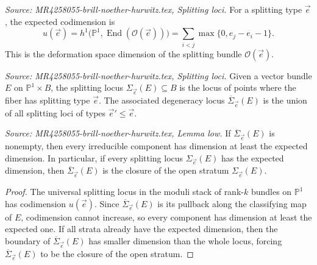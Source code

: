 \begin{definition}
  \label{def:expected-codim}
  \textit{Source: MR4258055-brill-noether-hurwitz.tex, Splitting loci.}
  For a splitting type \(\vec e\), the expected codimension is
  \[
  u(\vec e)=h^1\!\bigl(\mathbb P^1,\operatorname{End}(\mathcal O(\vec e))\bigr)
  =\sum_{i<j}\max\{0,e_j-e_i-1\}.
  \]
  This is the deformation space dimension of the splitting bundle \(\mathcal O(\vec e)\).
\end{definition}

\begin{definition}
  \label{def:splitting-locus}
  \textit{Source: MR4258055-brill-noether-hurwitz.tex, Splitting loci.}
  Given a vector bundle \(E\) on \(\mathbb P^1\times B\), the splitting locus \(\Sigma_{\vec e}(E)\subseteq B\) is the locus of points where the fiber has splitting type \(\vec e\). The associated degeneracy locus \(\overline{\Sigma}_{\vec e}(E)\) is the union of all splitting loci of types \(\vec e'\le \vec e\).
\end{definition}

\begin{lemma}
  \label{lem:low}
  \textit{Source: MR4258055-brill-noether-hurwitz.tex, Lemma low.}
  If \(\overline{\Sigma}_{\vec e}(E)\) is nonempty, then every irreducible component has dimension at least the expected dimension. In particular, if every splitting locus \(\Sigma_{\vec e}(E)\) has the expected dimension, then \(\overline{\Sigma}_{\vec e}(E)\) is the closure of the open stratum \(\Sigma_{\vec e}(E)\).
  \begin{proof}
    The universal splitting locus in the moduli stack of rank-\(k\) bundles on \(\mathbb P^1\) has codimension \(u(\vec e)\). Since \(\overline{\Sigma}_{\vec e}(E)\) is its pullback along the classifying map of \(E\), codimension cannot increase, so every component has dimension at least the expected one. If all strata already have the expected dimension, then the boundary of \(\overline{\Sigma}_{\vec e}(E)\) has smaller dimension than the whole locus, forcing \(\overline{\Sigma}_{\vec e}(E)\) to be the closure of the open stratum.
  \end{proof}
\end{lemma}

